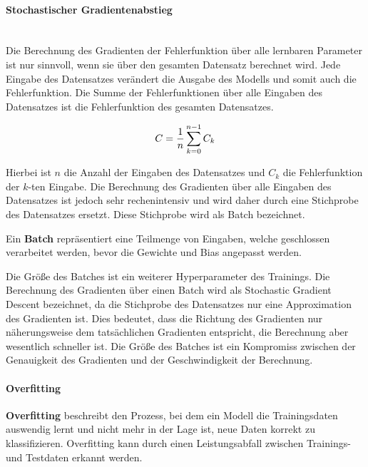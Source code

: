 \paragraph{Stochastischer Gradientenabstieg}\mbox{}\\
Die Berechnung des Gradienten der Fehlerfunktion über alle lernbaren Parameter ist nur sinnvoll, wenn sie über den gesamten Datensatz berechnet wird.
Jede Eingabe des Datensatzes verändert die Ausgabe des Modells und somit auch die Fehlerfunktion.
Die Summe der Fehlerfunktionen über alle Eingaben des Datensatzes ist die Fehlerfunktion des gesamten Datensatzes.

\begin{equation}
    C = \frac{1}{n}\sum_{k=0}^{n-1}C_k\\
\end{equation}

Hierbei ist $n$ die Anzahl der Eingaben des Datensatzes und $C_k$ die Fehlerfunktion der $k$-ten Eingabe.
Die Berechnung des Gradienten über alle Eingaben des Datensatzes ist jedoch sehr rechenintensiv und wird daher durch eine Stichprobe des Datensatzes ersetzt.
Diese Stichprobe wird als Batch bezeichnet.\\

\begin{definition}\label{def:batch}
    Ein \textbf{Batch} repräsentiert eine Teilmenge von Eingaben, welche geschlossen verarbeitet werden, bevor die Gewichte und Bias angepasst werden.
\end{definition}

Die Größe des Batches ist ein weiterer Hyperparameter des Trainings.
Die Berechnung des Gradienten über einen Batch wird als Stochastic Gradient Descent bezeichnet, da die Stichprobe des Datensatzes nur eine Approximation des Gradienten ist.
Dies bedeutet, dass die Richtung des Gradienten nur näherungsweise dem tatsächlichen Gradienten entspricht, die Berechnung aber wesentlich schneller ist.
Die Größe des Batches ist ein Kompromiss zwischen der Genauigkeit des Gradienten und der Geschwindigkeit der Berechnung.\\

\paragraph{Overfitting}
\begin{definition}\label{def:overfitting}
    \textbf{Overfitting} beschreibt den Prozess, bei dem ein Modell die Trainingsdaten auswendig lernt und nicht mehr in der Lage ist,
    neue Daten korrekt zu klassifizieren. Overfitting kann durch einen Leistungsabfall zwischen Trainings- und Testdaten erkannt werden.
\end{definition}

